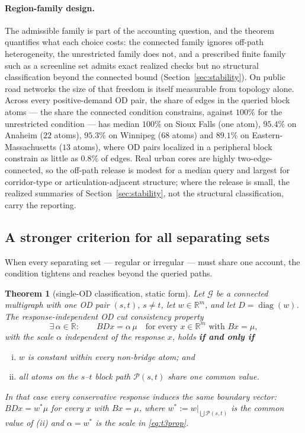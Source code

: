 \documentclass[a4paper,fleqn]{cas-sc}
\newtheorem{theorem}{Theorem}
\newcommand{\R}{\mathbb{R}}
\begin{document}
\paragraph{Region-family design.}
The admissible family is part of the accounting question, and the theorem
quantifies what each choice costs: the connected family ignores off-path
heterogeneity, the unrestricted family does not, and a prescribed finite
family such as a screenline set admits exact realized checks but no
structural classification beyond the connected bound
(Section~\ref{sec:stability}).
On public road networks the size of that freedom is itself measurable
from topology alone. Across every positive-demand OD pair, the share of
edges in the queried block atoms --- the share the connected condition
constrains, against $100\%$ for the unrestricted condition --- has
median $100\%$ on Sioux Falls (one atom), $95.4\%$ on Anaheim ($22$
atoms), $95.3\%$ on Winnipeg ($68$ atoms) and $89.1\%$ on
Eastern-Massachusetts ($13$ atoms), where OD pairs localized in a
peripheral block constrain as little as $0.8\%$ of edges. Real urban
cores are highly two-edge-connected, so the off-path release is
modest for a median query and largest for corridor-type or
articulation-adjacent structure; where the release is small, the
realized summaries of Section~\ref{sec:stability}, not the structural
classification, carry the reporting.

\subsection{A stronger criterion for all separating sets}\label{sec:allsets}
When every separating set --- regular or irregular --- must share one
account, the condition tightens and reaches beyond the queried paths.

\begin{theorem}[single-OD classification, static form]\label{thm:t3cpmain}
Let $\mathcal{G}$ be a connected multigraph with one OD pair $(s,t)$,
\textbf{$s\neq t$}, let
$w\in\R^m$, and let $D=\operatorname{diag}(w)$. The
\emph{response-independent OD cut consistency property}
\begin{equation}
\exists\,\alpha\in\R:\qquad BDx=\alpha\,\mu
\quad\text{for every }x\in\R^m\text{ with }Bx=\mu,
\label{eq:t3prop}
\end{equation}
with the scale $\alpha$ independent of the response $x$, holds
\textbf{if and only if}
\begin{enumerate}[(i)]
\item $w$ is constant within every non-bridge atom; and
\item all atoms on the $s$--$t$ block path $\mathcal{P}(s,t)$ share
one common value.
\end{enumerate}
In that case every conservative response induces the same boundary vector:
$BDx=w^*\mu$ for every $x$ with $Bx=\mu$, where
$w^*:=w|_{\bigcup\mathcal{P}(s,t)}$ is the common value of (ii) and
$\alpha=w^*$ is the scale in \eqref{eq:t3prop}.
\end{theorem}
\end{document}
